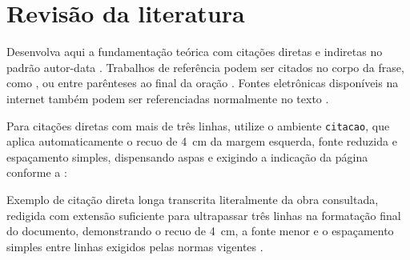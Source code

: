 \chapter{Revisão da literatura}
Desenvolva aqui a fundamentação teórica com citações diretas e indiretas no padrão autor-data \cite{abnt10520}. Trabalhos de referência podem ser citados no corpo da frase, como , ou entre parênteses ao final da oração \cite{slack2018}. Fontes eletrônicas disponíveis na internet também podem ser referenciadas normalmente no texto \cite{abntex2site}.

Para citações diretas com mais de três linhas, utilize o ambiente \texttt{citacao}, que aplica automaticamente o recuo de 4~cm da margem esquerda, fonte reduzida e espaçamento simples, dispensando aspas e exigindo a indicação da página conforme a :

\begin{citacao}
Exemplo de citação direta longa transcrita literalmente da obra consultada, redigida com extensão suficiente para ultrapassar três linhas na formatação final do documento, demonstrando o recuo de 4~cm, a fonte menor e o espaçamento simples entre linhas exigidos pelas normas vigentes \cite[p.~15]{gil2022}.
\end{citacao}
